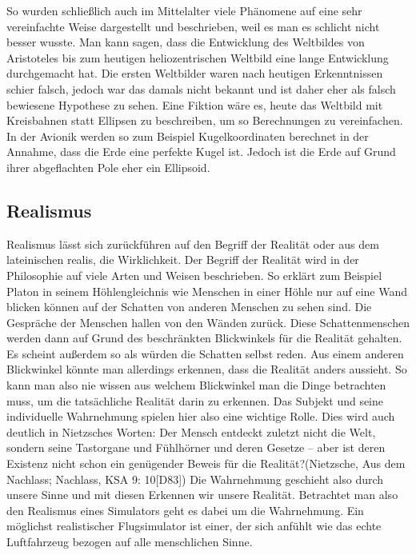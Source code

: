 \documentclass[12pt]{article}
\begin{document}
So wurden schließlich auch im Mittelalter viele Phänomene auf eine sehr vereinfachte Weise dargestellt und beschrieben, weil es man es schlicht nicht besser wusste. Man kann sagen, dass die Entwicklung des Weltbildes von Aristoteles bis zum heutigen heliozentrischen Weltbild eine lange Entwicklung durchgemacht hat. Die ersten Weltbilder waren nach heutigen Erkenntnissen schier falsch, jedoch war das damals nicht bekannt und ist daher eher als falsch bewiesene Hypothese zu sehen. Eine Fiktion wäre es, heute das Weltbild mit Kreisbahnen statt Ellipsen zu beschreiben, um so Berechnungen zu vereinfachen.\newline
In der Avionik werden so zum Beispiel Kugelkoordinaten berechnet in der Annahme, dass die Erde eine perfekte Kugel ist. Jedoch ist die Erde auf Grund ihrer abgeflachten Pole eher ein Ellipsoid.

\subsection{Realismus}
Realismus lässt sich zurückführen auf den Begriff der Realität oder aus dem lateinischen \glqq realis\grqq{}, die Wirklichkeit.
Der Begriff der Realität wird in der Philosophie auf viele Arten und Weisen beschrieben. So erklärt zum Beispiel Platon in seinem Höhlengleichnis wie Menschen in einer Höhle nur auf eine Wand blicken können auf der Schatten von anderen Menschen zu sehen sind. Die Gespräche der Menschen hallen von den Wänden zurück. Diese Schattenmenschen werden dann auf Grund des beschränkten Blickwinkels für die Realität gehalten. Es scheint außerdem so als würden die Schatten selbst reden. Aus einem anderen Blickwinkel könnte man allerdings erkennen, dass die Realität anders aussieht. So kann man also nie wissen aus welchem Blickwinkel man die Dinge betrachten muss, um die tatsächliche Realität darin zu erkennen.\newline
Das Subjekt und seine individuelle Wahrnehmung spielen hier also eine wichtige Rolle. Dies wird auch deutlich in Nietzsches Worten: \glqq Der Mensch entdeckt zuletzt nicht die Welt, sondern seine Tastorgane und Fühlhörner und deren Gesetze – aber ist deren Existenz nicht schon ein genügender Beweis für die Realität?\grqq (Nietzsche, Aus dem Nachlass; Nachlass, KSA 9: 10[D83]) Die Wahrnehmung geschieht also durch unsere Sinne und mit diesen Erkennen wir unsere Realität.\newline
Betrachtet man also den Realismus eines Simulators geht es dabei um die Wahrnehmung. Ein möglichst realistischer Flugsimulator ist einer, der sich anfühlt wie das echte Luftfahrzeug bezogen auf alle menschlichen Sinne.
%
%
\end{document}
